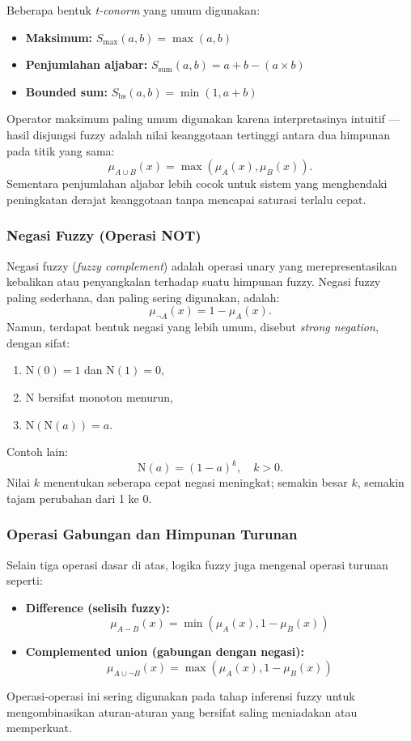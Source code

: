 \documentclass[12pt,a4paper]{article}
\theoremstyle{remark}
\begin{document}
Beberapa bentuk \textit{t-conorm} yang umum digunakan:
\begin{itemize}
    \item \textbf{Maksimum:} \(S_{\max}(a,b) = \max(a,b)\)
    \item \textbf{Penjumlahan aljabar:} \(S_{\text{sum}}(a,b) = a + b - (a \times b)\)
    \item \textbf{Bounded sum:} \(S_{\text{bs}}(a,b) = \min(1, a + b)\)
\end{itemize}

Operator maksimum paling umum digunakan karena interpretasinya intuitif — hasil disjungsi fuzzy adalah nilai keanggotaan tertinggi antara dua himpunan pada titik yang sama:
\[
    \mu_{A \cup B}(x) = \max(\mu_A(x), \mu_B(x)).
\]
Sementara penjumlahan aljabar lebih cocok untuk sistem yang menghendaki peningkatan derajat keanggotaan tanpa mencapai saturasi terlalu cepat.

\subsubsection{Negasi Fuzzy (Operasi NOT)}
Negasi fuzzy (\textit{fuzzy complement}) adalah operasi unary yang merepresentasikan kebalikan atau penyangkalan terhadap suatu himpunan fuzzy.
Negasi fuzzy paling sederhana, dan paling sering digunakan, adalah:
\[
    \mu_{\neg A}(x) = 1 - \mu_A(x).
\]
Namun, terdapat bentuk negasi yang lebih umum, disebut \textit{strong negation}, dengan sifat:
\begin{enumerate}
    \item \(\text{N}(0) = 1\) dan \(\text{N}(1) = 0\),
    \item \(\text{N}\) bersifat monoton menurun,
    \item \(\text{N}(\text{N}(a)) = a\).
\end{enumerate}
Contoh lain:
\[
    \text{N}(a) = (1 - a)^k, \quad k > 0.
\]
Nilai \(k\) menentukan seberapa cepat negasi meningkat; semakin besar \(k\), semakin tajam perubahan dari 1 ke 0.

\subsubsection{Operasi Gabungan dan Himpunan Turunan}
Selain tiga operasi dasar di atas, logika fuzzy juga mengenal operasi turunan seperti:
\begin{itemize}
    \item \textbf{Difference (selisih fuzzy):}
          \[
              \mu_{A - B}(x) = \min(\mu_A(x), 1 - \mu_B(x))
          \]
    \item \textbf{Complemented union (gabungan dengan negasi):}
          \[
              \mu_{A \cup \neg B}(x) = \max(\mu_A(x), 1 - \mu_B(x))
          \]
\end{itemize}
Operasi-operasi ini sering digunakan pada tahap inferensi fuzzy untuk mengombinasikan aturan-aturan yang bersifat saling meniadakan atau memperkuat.
\end{document}
